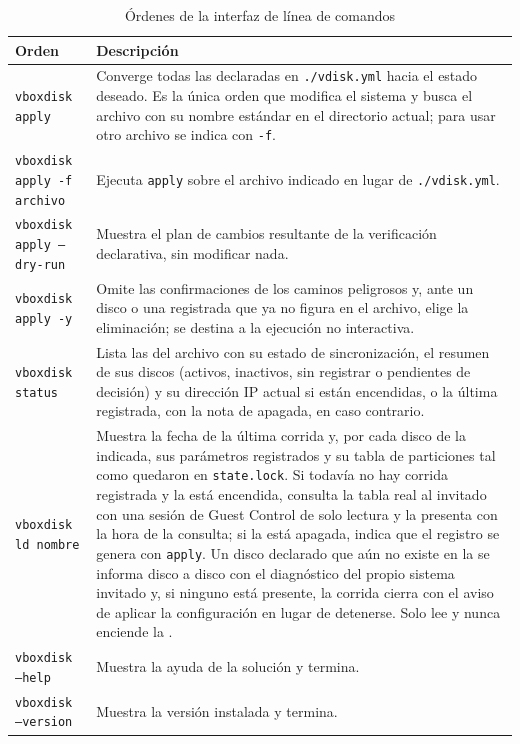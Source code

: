\begin{table}[H]
    \centering
    \caption{Órdenes de la interfaz de línea de comandos}
    \label{tab:comandos}
    \begin{tabular}{@{}lp{9.4cm}@{}}
        \toprule
        \textbf{Orden} & \textbf{Descripción} \\
        \midrule
        \texttt{vboxdisk apply} & Converge todas las \vm{} declaradas en \texttt{./vdisk.yml} hacia el estado deseado. Es la única orden que modifica el sistema y busca el archivo con su nombre estándar en el directorio actual; para usar otro archivo se indica con \texttt{-f}. \\
        \texttt{vboxdisk apply -f archivo} & Ejecuta \texttt{apply} sobre el archivo indicado en lugar de \texttt{./vdisk.yml}. \\
        \texttt{vboxdisk apply --dry-run} & Muestra el plan de cambios resultante de la verificación declarativa, sin modificar nada. \\
        \texttt{vboxdisk apply -y} & Omite las confirmaciones de los caminos peligrosos y, ante un disco o una \vm{} registrada que ya no figura en el archivo, elige la eliminación; se destina a la ejecución no interactiva. \\
        \texttt{vboxdisk status} & Lista las \vm{} del archivo con su estado de sincronización, el resumen de sus discos (activos, inactivos, sin registrar o pendientes de decisión) y su dirección IP actual si están encendidas, o la última registrada, con la nota de apagada, en caso contrario. \\
        \texttt{vboxdisk ld nombre} & Muestra la fecha de la última corrida y, por cada disco de la \vm{} indicada, sus parámetros registrados y su tabla de particiones tal como quedaron en \texttt{state.lock}. Si todavía no hay corrida registrada y la \vm{} está encendida, consulta la tabla real al invitado con una sesión de Guest Control de solo lectura y la presenta con la hora de la consulta; si la \vm{} está apagada, indica que el registro se genera con \texttt{apply}. Un disco declarado que aún no existe en la \vm{} se informa disco a disco con el diagnóstico del propio sistema invitado y, si ninguno está presente, la corrida cierra con el aviso de aplicar la configuración en lugar de detenerse. Solo lee y nunca enciende la \vm{}. \\
        \texttt{vboxdisk --help} & Muestra la ayuda de la solución y termina. \\
        \texttt{vboxdisk --version} & Muestra la versión instalada y termina. \\
        \bottomrule
    \end{tabular}
\end{table}

